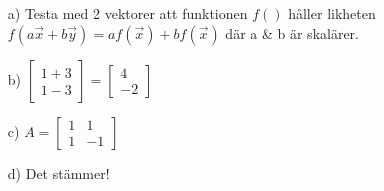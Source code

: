 \begin{itemize}
	\item[a) ] Testa med 2 vektorer att funktionen $f()$ håller likheten $f(a\vec{x}+b\vec{y})=af(\vec{x})+bf(\vec{x})$ där a \& b är skalärer.
	\item[b) ] $\begin{bmatrix}1+3\\1-3\end{bmatrix}=\begin{bmatrix}4\\-2\end{bmatrix}$
	\item[c) ] $A=\begin{bmatrix}1&1\\1&-1\end{bmatrix}$
	\item[d) ] Det stämmer!
\end{itemize}
